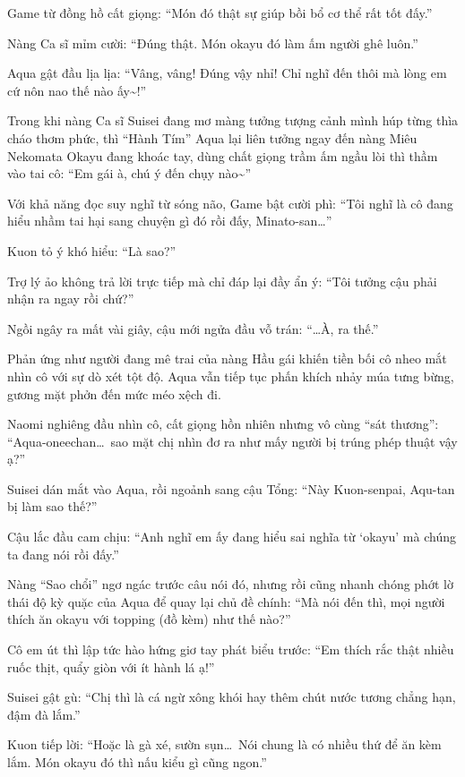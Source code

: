 \documentclass[../main.tex]{subfiles}
\begin{document}
Game từ đồng hồ cất giọng: ``Món đó thật sự giúp bồi bổ cơ thể rất tốt đấy.''

Nàng Ca sĩ mỉm cười: ``Đúng thật. Món okayu đó làm ấm người ghê luôn.''

Aqua gật đầu lịa lịa: ``Vâng, vâng! Đúng vậy nhỉ! Chỉ nghĩ đến thôi mà lòng em cứ nôn nao thế nào ấy\~{}!''

Trong khi nàng Ca sĩ Suisei đang mơ màng tưởng tượng cảnh mình húp từng thìa cháo thơm phức, thì ``Hành Tím'' Aqua lại liên tưởng ngay đến nàng Miêu Nekomata Okayu đang khoác tay, dùng chất giọng trầm ấm ngầu lòi thì thầm vào tai cô: ``Em gái à, chú ý đến chụy nào\~{}''


Với khả năng đọc suy nghĩ từ sóng não, Game bật cười phì: ``Tôi nghĩ là cô đang hiểu nhầm tai hại sang chuyện gì đó rồi đấy, Minato-san\dots''

Kuon tỏ ý khó hiểu: ``Là sao?''

Trợ lý ảo không trả lời trực tiếp mà chỉ đáp lại đầy ẩn ý: ``Tôi tưởng cậu phải nhận ra ngay rồi chứ?''

Ngồi ngây ra mất vài giây, cậu mới ngửa đầu vỗ trán: ``\dots À, ra thế.''

Phản ứng như người đang mê trai của nàng Hầu gái khiến tiền bối cô nheo mắt nhìn cô với sự dò xét tột độ. Aqua vẫn tiếp tục phấn khích nhảy múa tưng bừng, gương mặt phởn đến mức méo xệch đi.

Naomi nghiêng đầu nhìn cô, cất giọng hồn nhiên nhưng vô cùng ``sát thương'': ``Aqua-oneechan\dots\ sao mặt chị nhìn đơ ra như mấy người bị trúng phép thuật vậy ạ?''

Suisei dán mắt vào Aqua, rồi ngoảnh sang cậu Tổng: ``Này Kuon-senpai, Aqu-tan bị làm sao thế?''

Cậu lắc đầu cam chịu: ``Anh nghĩ em ấy đang hiểu sai nghĩa từ `okayu' mà chúng ta đang nói rồi đấy.''

Nàng ``Sao chổi'' ngơ ngác trước câu nói đó, nhưng rồi cũng nhanh chóng phớt lờ thái độ kỳ quặc của Aqua để quay lại chủ đề chính: ``Mà nói đến thì, mọi người thích ăn okayu với topping (đồ kèm) như thế nào?''

Cô em út thì lập tức hào hứng giơ tay phát biểu trước: ``Em thích rắc thật nhiều ruốc thịt, quẩy giòn với ít hành lá ạ!''

Suisei gật gù: ``Chị thì là cá ngừ xông khói hay thêm chút nước tương chẳng hạn, đậm đà lắm.''

Kuon tiếp lời: ``Hoặc là gà xé, sườn sụn\dots\ Nói chung là có nhiều thứ để ăn kèm lắm. Món okayu đó thì nấu kiểu gì cũng ngon.''
\end{document}
